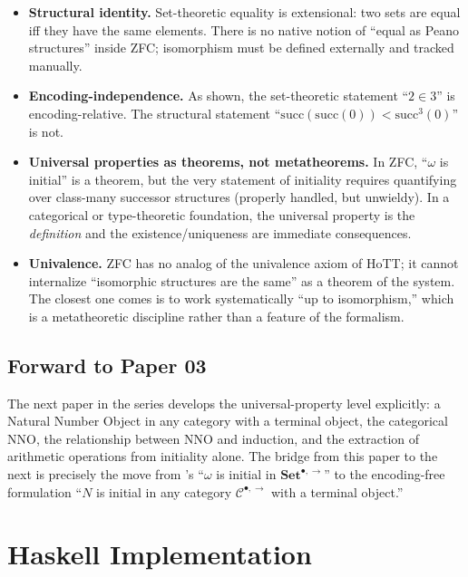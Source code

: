 \documentclass[12pt]{article}
\theoremstyle{definition}
\theoremstyle{remark}
\begin{document}
\begin{itemize}
\item \textbf{Structural identity.} Set-theoretic equality is extensional:
two sets are equal iff they have the same elements. There is no native
notion of ``equal as Peano structures'' inside ZFC; isomorphism must be
defined externally and tracked manually.

\item \textbf{Encoding-independence.} As shown, the set-theoretic statement
``$2 \in 3$'' is encoding-relative. The structural statement ``$\mathrm{succ}(\mathrm{succ}(0)) < \mathrm{succ}^3(0)$'' is not.

\item \textbf{Universal properties as theorems, not metatheorems.} In
ZFC, ``$\omega$ is initial'' is a theorem, but the very statement of
initiality requires quantifying over class-many successor structures
(properly handled, but unwieldy). In a categorical or type-theoretic
foundation, the universal property is the \emph{definition} and the
existence/uniqueness are immediate consequences.

\item \textbf{Univalence.} ZFC has no analog of the univalence axiom of
HoTT; it cannot internalize ``isomorphic structures are the same'' as a
theorem of the system. The closest one comes is to work systematically
``up to isomorphism,'' which is a metatheoretic discipline rather than
a feature of the formalism.
\end{itemize}

\subsection{Forward to Paper 03}

The next paper in the series develops the universal-property level
explicitly: a Natural Number Object in any category with a terminal object,
the categorical NNO, the relationship between NNO and induction, and the
extraction of arithmetic operations from initiality alone. The bridge from
this paper to the next is precisely the move from
's ``$\omega$ is initial in $\mathbf{Set}^{\bullet,\to}$''
to the encoding-free formulation
``$N$ is initial in any category $\mathcal{C}^{\bullet,\to}$ with a terminal
object.''

\section{Haskell Implementation}
\label{sec:haskell}
\end{document}
